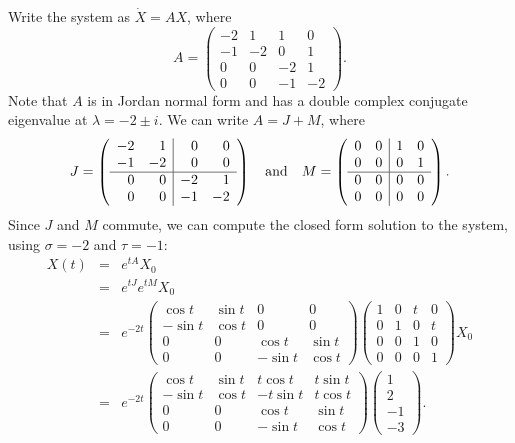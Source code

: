 \documentclass{ximera}
\begin{document}
\begin{exercise}
\begin{solution}
\soln Write the system as $\dot{X} = AX$, where
\[
A =
\left(\begin{array}{rrrr}
-2 & 1 & 1 & 0 \\
-1 & -2 & 0 & 1 \\
0 & 0 & -2 & 1 \\
0 & 0 & -1 & -2
\end{array}\right).
\]
Note that $A$ is in Jordan normal form and has a double complex conjugate
eigenvalue at $\lambda = -2 \pm i$.  We can write $A = J + M$, where
\[
J = 
\left(\begin{array}{rr|rr}
-2 & 1 & 0 & 0 \\
-1 & -2 & 0 & 0 \\
\hline
0 & 0 & -2 & 1 \\
0 & 0 & -1 & -2
\end{array}\right) \quad\mbox{and}\quad
M =
\left(\begin{array}{rr|rr}
0 & 0 & 1 & 0 \\
0 & 0 & 0 & 1 \\
\hline
0 & 0 & 0 & 0 \\
0 & 0 & 0 & 0
\end{array}\right).
\]
Since $J$ and $M$ commute, we can compute the closed form solution to the
system, using $\sigma = -2$ and $\tau = -1$:
\[
\begin{array}{rcl}
X(t) & = & e^{tA}X_0 \\
& = & e^{tJ}e^{tM}X_0 \\
& = & e^{-2t}\left(\begin{array}{rr|rr}
\cos t & \sin t & 0 & 0 \\
-\sin t & \cos t & 0 & 0 \\
\hline
0 & 0 & \cos t & \sin t \\
0 & 0 & -\sin t & \cos t
\end{array}\right)
\left(\begin{array}{rr|rr}
1 & 0 & t & 0 \\
0 & 1 & 0 & t \\
\hline
0 & 0 & 1 & 0 \\
0 & 0 & 0 & 1
\end{array}\right)X_0 \\
& = & e^{-2t}
\left(\begin{array}{rr|rr}
\cos t & \sin t & t\cos t & t\sin t \\
-\sin t & \cos t & -t\sin t & t\cos t \\
\hline
0 & 0 & \cos t & \sin t \\
0 & 0 & -\sin t & \cos t
\end{array}\right)
\left(\begin{array}{r} 1 \\ 2 \\ -1 \\ -3 \end{array}\right).
\end{array}
\]

\end{solution}
\end{exercise}
\end{document}

